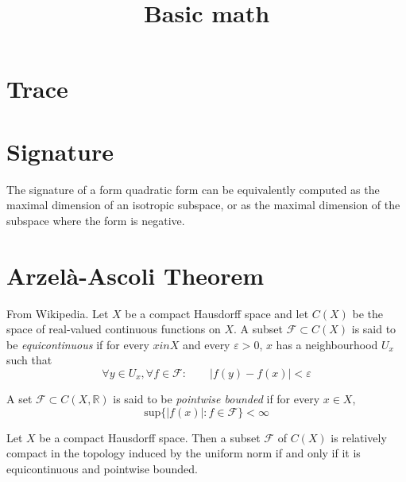 



\title{Basic math}
\maketitle

\label{section-phantom}

\tableofcontents

\section{Trace}
\label{section-trace}

\begin{proposition}
\label{proposition-trace-is-coordinate-independent}

\end{proposition}

\section{Signature}
\label{section-signature}

The signature of a form quadratic form can be equivalently computed as the
maximal dimension of an isotropic subspace, or as the maximal dimension of the
subspace where the form is negative.

\section{Arzelà-Ascoli Theorem}
\label{section-Arzela-Ascoli-theorem}
\begin{definition}
\label{definition-equicontinuous}
From Wikipedia. Let $X$ be a compact Hausdorff space and let  $C(X)$ be the
space of real-valued continuous functions on $X$. A subset $\mathcal{F} \subset
C(X)$ is said to be {\it equicontinuous} if for every $x in X$ and every
$\varepsilon>0$, $x$ has a neighbourhood $U_x$ such that
$$
\forall y \in U_x, \forall f \in \mathcal{F}: \qquad |f(y)-f(x)|<\varepsilon
$$
\end{definition}

\begin{definition}
\label{definition-pointwise-bounded}
A set $\mathcal{F}\subset C(X,\mathbb{R})$ is said to be {\it pointwise
bounded} if for every $x \in X$,
$$
\text{sup}\{|f(x)|:f \in \mathcal{F}\}<\infty
$$
\end{definition}

\begin{theorem}
\label{theorem-Arzela-Ascoli}
Let $X$ be a compact Hausdorff space. Then a subset $\mathcal{F}$ of $C(X)$ is
relatively compact in the topology induced by the uniform norm if and only if it
is equicontinuous and pointwise bounded.
\end{theorem}







